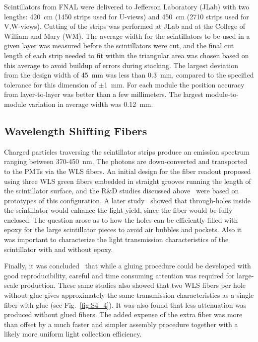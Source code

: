 Scintillators from FNAL were delivered to Jefferson Laboratory (JLab) with two lengths: 420~cm (1450 strips
used for U-views) and 450~cm (2710 strips used for V,W-views). Cutting of the strips was performed at JLab
and at the College of William and Mary (WM). The average width for the scintillators to be used in a given layer
was measured before the scintillators were cut, and the final cut length of each strip needed to fit within the
triangular area was chosen based on this average to avoid buildup of errors during stacking. The largest deviation
from the design width of 45~mm was less than 0.3~mm, compared to the specified tolerance for this dimension
of $\pm$1~mm.  For each module the position accuracy from layer-to-layer was better than a few millimeters. The
largest module-to-module variation in average width was 0.12~mm.

\subsection{Wavelength Shifting Fibers}

Charged particles traversing the scintillator strips produce an emission spectrum ranging between 370-450~nm.
The photons are down-converted and transported to the PMTs via the WLS fibers. An initial design for the fiber
readout proposed using three WLS green fibers embedded in straight grooves running the length of the scintillator
surface, and the R$\&$D studies discussed above~\cite{2007007} were based on prototypes of this configuration.
A later study~\cite{2009018} showed that through-holes inside the scintillator would enhance the light yield, since
the fiber would be fully enclosed. The question arose as to how the holes can be efficiently filled with epoxy for the
large scintillator pieces to avoid air bubbles and pockets. Also it was important to characterize the light transmission
characteristics of the scintillator with and without epoxy.

Finally, it was concluded~\cite{2010012} that while a gluing procedure could be developed with good
reproducibility, careful and time consuming attention was required for large-scale production. These same studies
also showed that two WLS fibers per hole without glue gives approximately the same transmission characteristics
as a single fiber with glue (see Fig.~\ref{fig:S4_4}). It was also found that less attenuation was produced without
glued fibers. The added expense of the extra fiber was more than offset by a much faster and simpler assembly
procedure together with a likely more uniform light collection efficiency. 

